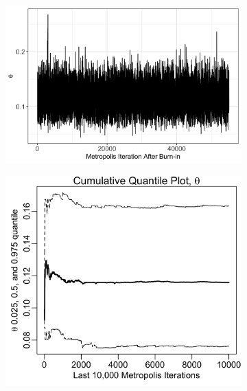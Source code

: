\documentclass{uwstat572}
\begin{document}
\begin{figure}[H]
	\centering
	\begin{subfigure}[b]{\textwidth}
		\includegraphics[width=\textwidth]{figures/theta_mcmc_chain.png}
		\caption{}
	\label{fig:quant_mu}
	\end{subfigure}
	\qquad
	\begin{subfigure}[b]{0.49\textwidth}
		\includegraphics[width=\textwidth]{figures/mcmc_cum_quant_plot_theta.png}
		\caption{}
		\label{fig:quant_theta}
	\end{subfigure}
	\hfill
	\begin{subfigure}[b]{0.49\textwidth}

\end{subfigure}
\end{figure}
\end{document}
